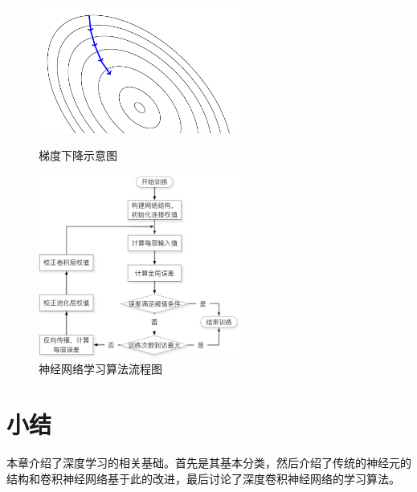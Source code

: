\begin{figure}[hbt]
	\centering
	\begin{minipage}[b][][b]{7cm}
		\includegraphics[width=6.67cm]{figures/networks/gradient-descent}
    \caption{梯度下降示意图}
    \label{fig:gradient-descent}
	\end{minipage}
	\hspace{10pt}
	\begin{minipage}[b][][b]{7cm}
		\includegraphics[width=6.67cm]{figures/networks/cnn_train}
    \caption{神经网络学习算法流程图}
    \label{fig:cnn_train}

	\end{minipage}

\end{figure}

\section{小结}
\label{sec:network_summary}
本章介绍了深度学习的相关基础。首先是其基本分类，然后介绍了传统的神经元的结构和卷积神经网络基于此的改进，最后讨论了深度卷积神经网络的学习算法。
